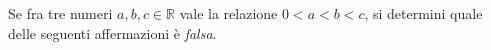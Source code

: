 Se fra tre numeri $a, b, c \in \mathbb{R}$ vale la relazione $0 < a < b < c$,
si determini quale delle seguenti affermazioni è
\emph{falsa}.